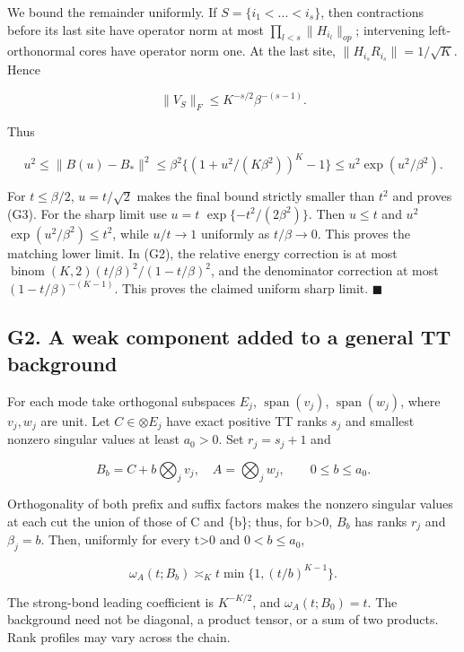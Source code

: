\documentclass[
  11pt,
]{article}
\begin{document}
We bound the remainder uniformly. If \(S=\{i_1<...<i_s\}\), then
contractions before its last site have operator norm at most
\(\prod _{l<s}\|H_{i_l}\|_{op}\); intervening left-orthonormal cores
have operator norm one. At the last site,
\(\|H_{i_s}R_{i_s}\|=1/\sqrt{K}\). Hence

\[
 \|V_S\|_F\le K^{-s/2}\beta^{-(s-1)}.
\]

Thus

\[
 u^2\le\|B(u)-B_*\|^2
 \le\beta^2\{(1+u^2/(K\beta^2))^K-1\}
 \le u^2\exp(u^2/\beta^2).
\]

For \(t\le \beta /2\), \(u=t/\sqrt 2\) makes the final bound strictly
smaller than \(t^{2}\) and proves (G3). For the sharp limit use \(u=t\)
\(\operatorname{exp}\{-t^{2}/(2\beta ^{2})\}\). Then \(u\le t\) and
\(u^{2}\) \(\operatorname{exp}(u^{2}/\beta ^{2})\le t^{2}\), while
\(u/t\to 1\) uniformly as \(t/\beta \to 0\). This proves the matching
lower limit. In (G2), the relative energy correction is at most
\(\operatorname{binom}(K,2)(t/\beta )^{2}/(1-t/\beta )^{2}\), and the
denominator correction at most \((1-t/\beta )^{-(K-1)}\). This proves
the claimed uniform sharp limit. \(\blacksquare\)

\subsection{G2. A weak component added to a general TT
background}\label{g2.-a-weak-component-added-to-a-general-tt-background}

For each mode take orthogonal subspaces \(E_j\),
\(\operatorname{span}(v_j)\), \(\operatorname{span}(w_j)\), where
\(v_j,w_j\) are unit. Let \(C\in \otimes E_j\) have exact positive TT
ranks \(s_j\) and smallest nonzero singular values at least \(a_0>0\).
Set \(r_j=s_j+1\) and

\[
 B_b=C+b\bigotimes_jv_j,\quad A=\bigotimes_jw_j,
 \qquad0\le b\le a_0.
\]

Orthogonality of both prefix and suffix factors makes the nonzero
singular values at each cut the union of those of C and \{b\}; thus, for
b\textgreater0, \(B_b\) has ranks \(r_j\) and \(\beta _j=b\). Then,
uniformly for every t\textgreater0 and \(0<b\le a_0\),

\[
 \omega_A(t;B_b)\asymp_K t\min\{1,(t/b)^{K-1}\}.
\]

The strong-bond leading coefficient is \(K^{-K/2}\), and
\(\omega _A(t;B_0)=t\). The background need not be diagonal, a product
tensor, or a sum of two products. Rank profiles may vary across the
chain.
\end{document}
